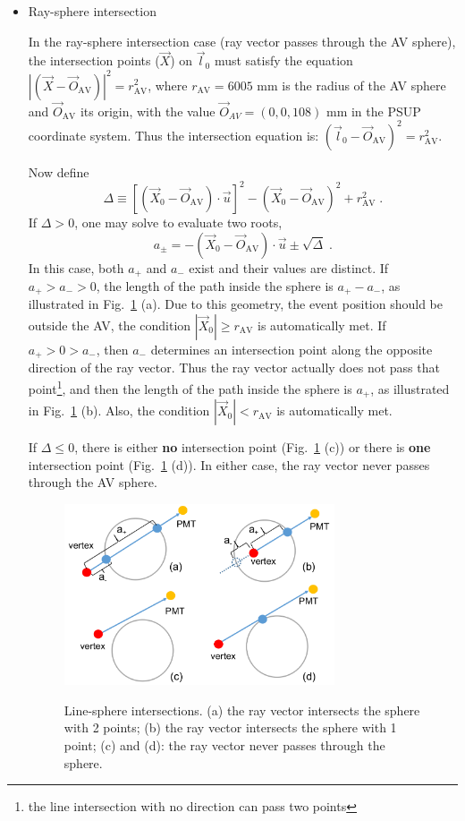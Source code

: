 \begin{itemize}
\item Ray-sphere intersection

In the ray-sphere intersection case (ray vector passes through the AV sphere), the intersection points ($\vec{X}$) on $\vec{l}_0$ must satisfy the equation $|(\vec{X}-\vec{O}_\mathrm{AV})|^2= r^2_\mathrm{AV}$, where $r_\mathrm{AV}=6005$ mm is the radius of the AV sphere and $\vec{O}_\mathrm{AV}$ its origin, with the value $\vec{O}_{AV} = (0,0,108)$ mm in the PSUP coordinate system. Thus the intersection equation is:
$(\vec{l}_0-\vec{O}_\mathrm{AV})^2 = r^2_\mathrm{AV}$.

Now define 
\begin{equation}
\Delta \equiv {[(\vec{X}_0-\vec{O}_\mathrm{AV})\cdot\vec{u}]}^2-{(\vec{X}_0-\vec{O}_\mathrm{AV})}^2+r^2_\mathrm{AV} \; .
\end{equation}
If $\Delta>0$, one may solve to evaluate two roots,
\begin{equation}\label{eq:ray-sphere}
a_{\pm} = -(\vec{X}_0-\vec{O}_\mathrm{AV})\cdot\vec{u}\pm\sqrt{\Delta} \;.
\end{equation}
In this case, both $a_+$ and $a_-$ exist and their values are distinct. If $a_{+} > a_{-} > 0$, the length of the path inside the sphere is $a_{+} - a_{-} $, as illustrated in Fig.~\ref{line-sphere} (a). Due to this geometry, the event position should be outside the AV, the condition $|\vec{X}_0|\geq r_\mathrm{AV}$ is automatically met. If $a_{+} > 0 >a_{-}$, then $a_{-}$ determines an intersection point along the opposite direction of the ray vector. Thus the ray vector actually does not pass that point\footnote{the line intersection with no direction can pass two points}, and then the length of the path inside the sphere is $a_{+}$, as illustrated in Fig.~\ref{line-sphere} (b). Also, the condition $|\vec{X}_0| < r_\mathrm{AV}$ is automatically met. 

If $\Delta\leq 0$, there is either {\bf no} intersection point (Fig.~\ref{line-sphere} (c)) or there is {\bf one} intersection point (Fig.~\ref{line-sphere} (d)). In either case, the ray vector never passes through the AV sphere.

\begin{figure}
	\centering
{\includegraphics[width=80mm]{line-sphere.png}}
\caption[Line-sphere intersections.]{Line-sphere intersections. (a) the ray vector intersects the sphere with 2 points; (b) the ray vector intersects the sphere with 1 point; (c) and (d): the ray vector never passes through the sphere.}\label{line-sphere}
\end{figure}


\end{itemize}
